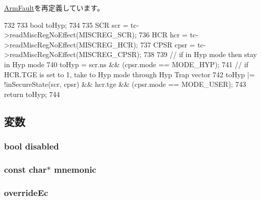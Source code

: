 \hyperlink{classArmISA_1_1ArmFault_a6fa7b734487c2a8da04a28ace414a355}{ArmFault}を再定義しています。


\begin{DoxyCode}
732 {
733     bool toHyp;
734 
735     SCR  scr  = tc->readMiscRegNoEffect(MISCREG_SCR);
736     HCR  hcr  = tc->readMiscRegNoEffect(MISCREG_HCR);
737     CPSR cpsr = tc->readMiscRegNoEffect(MISCREG_CPSR);
738 
739     // if in Hyp mode then stay in Hyp mode
740     toHyp  = scr.ns && (cpsr.mode == MODE_HYP);
741     // if HCR.TGE is set to 1, take to Hyp mode through Hyp Trap vector
742     toHyp |= !inSecureState(scr, cpsr) && hcr.tge && (cpsr.mode == MODE_USER);
743     return toHyp;
744 }
\end{DoxyCode}


\subsection{変数}
\hypertarget{classArmISA_1_1UndefinedInstruction_a4295e1a543aa3694e2987c6731c226ad}{
\subsubsection[{disabled}]{\setlength{\rightskip}{0pt plus 5cm}bool {\bf disabled}}}
\label{classArmISA_1_1UndefinedInstruction_a4295e1a543aa3694e2987c6731c226ad}
\hypertarget{classArmISA_1_1UndefinedInstruction_adfacb526b8ab378bf36f1324303635d0}{
\subsubsection[{mnemonic}]{\setlength{\rightskip}{0pt plus 5cm}const char$\ast$ {\bf mnemonic}}}
\label{classArmISA_1_1UndefinedInstruction_adfacb526b8ab378bf36f1324303635d0}
\hypertarget{classArmISA_1_1UndefinedInstruction_af5e67d95019a0b5aba4c42205567eda7}{
\subsubsection[{overrideEc}]{ {\bf overrideEc}}}
